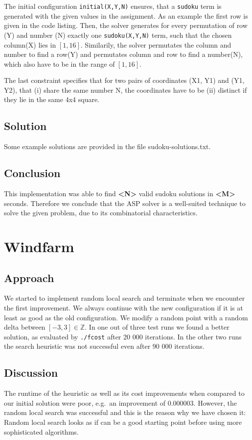 \documentclass{article}
\begin{document}
The initial configuration \texttt{initial(X,Y,N)} ensures, that a \texttt{sudoku} term is generated with the given values in the assignment. As an example the first row is given in the code listing.
Then, the solver generates for every permutation of row (Y) and number (N) exactly one \texttt{sudoku(X,Y,N)} term, such that the chosen column(X) lies in $[1, 16]$.
Similarily, the solver permutates the column and number to find a row(Y) and permutates column and row to find a number(N), which also have to be in the range of $[1, 16]$.

The last constraint specifies that for two pairs of coordinates (X1, Y1) and (Y1, Y2), that (i) share the same number N, the coordinates have to be (ii) distinct if they lie in the same 4x4 square.

\subsection{Solution}
Some example solutions are provided in the file sudoku-solutions.txt.

\subsection{Conclusion}
This implementation was able to find \textbf{\textless N\textgreater} valid sudoku solutions in \textbf{\textless M\textgreater} seconds. Therefore we conclude that the ASP solver is a well-suited technique to solve the given problem, due to its combinatorial characteristics.


\clearpage
\section{Windfarm}


\subsection{Approach}
We started to implement random local search and terminate when we encounter the first improvement.
We always continue with the new configuration if it is at least as good as the old configuration.
We modify a random point with a random delta between $[-3,3] \in \mathbb{Z}$.
In one out of three test runs we found a better solution, as evaluated by \texttt{./fcost} after 20 000 iterations. In the other two runs the search heuristic was not successful even after 90 000 iterations.

\subsection{Discussion}
The runtime of the heuristic as well as its cost improvements when compared to our initial solution were poor, e.g.\ an improvement of 0.000003.
However, the random local search was successful and this is the reason why we have chosen it:
Random local search looks as if can be a good starting point before using more sophisticated algorithms.
\end{document}
